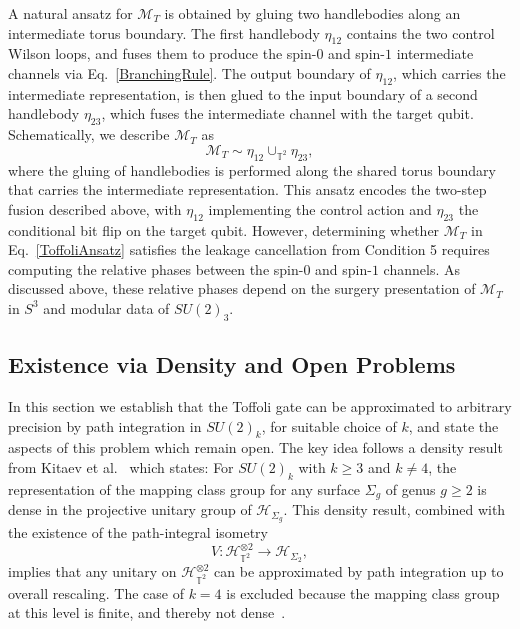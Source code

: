 \documentclass[12pt,a4paper]{article}
\begin{document}
A natural ansatz for $\mathcal{M}_T$ is obtained by gluing two handlebodies along an intermediate torus boundary. The first handlebody $\eta_{12}$ contains the two control Wilson loops, and fuses them to produce the spin-$0$ and spin-$1$ intermediate channels via Eq.\ \eqref{BranchingRule}. The output boundary of $\eta_{12}$, which carries the intermediate representation, is then glued to the input boundary of a second handlebody $\eta_{23}$, which fuses the intermediate channel with the target qubit. Schematically, we describe $\mathcal{M}_T$ as
%
\begin{equation}\label{ToffoliAnsatz}
\mathcal{M}_T \sim \eta_{12} \cup_{\mathbb{T}^2} \eta_{23},
\end{equation}
%
where the gluing of handlebodies is performed along the shared torus boundary that carries the intermediate representation. This ansatz encodes the two-step fusion described above, with $\eta_{12}$ implementing the control action and $\eta_{23}$ the conditional bit flip on the target qubit. However, determining whether $\mathcal{M}_T$ in Eq.\ \eqref{ToffoliAnsatz} satisfies the leakage cancellation from Condition 5 requires computing the relative phases between the spin-$0$ and spin-$1$ channels. As discussed above, these relative phases depend on the surgery presentation of $\mathcal{M}_T$ in $S^3$ and modular data of $SU(2)_3$.

\subsection{Existence via Density and Open Problems}\label{subsec:existence}

In this section we establish that the Toffoli gate can be approximated to arbitrary precision by path integration in $SU(2)_k$, for suitable choice of $k$, and state the aspects of this problem which remain open. The key idea follows a density result from Kitaev et al.~\cite{Freedman2003} which states: For $SU(2)_k$ with $k \geq 3$ and $k \neq 4$, the representation of the mapping class group for any surface $\Sigma_g$ of genus $g \geq 2$ is dense in the projective unitary group of $\mathcal{H}_{\Sigma_g}$. This density result, combined with the existence of the path-integral isometry~\cite{Salton:2016qpp}
%
\begin{equation}\label{EmbeddingIsometry}
    V: \mathcal{H}_{\mathbb{T}^2}^{\otimes 2} \to \mathcal{H}_{\Sigma_2},
\end{equation}
%
implies that any unitary on $\mathcal{H}_{\mathbb{T}^2}^{\otimes 2}$ can be approximated by path integration up to overall rescaling. The case of $k = 4$ is excluded because the mapping class group at this level is finite, and thereby not dense~\cite{Freedman2003}.
\end{document}
